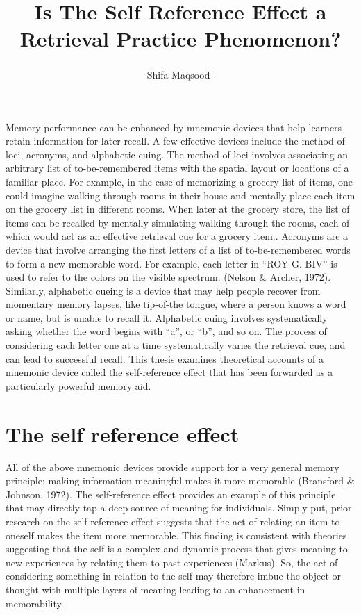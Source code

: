 \documentclass[
  man,floatsintext]{apa6}
\title{Is The Self Reference Effect a Retrieval Practice Phenomenon?}
\author{Shifa Maqsood\textsuperscript{1}}
\date{}
\affiliation{\vspace{0.5cm}\textsuperscript{1} Brooklyn College of CUNY}
\begin{document}
\maketitle

Memory performance can be enhanced by mnemonic devices that help learners retain information for later recall. A few effective devices include the method of loci, acronyms, and alphabetic cuing. The method of loci involves associating an arbitrary list of to-be-remembered items with the spatial layout or locations of a familiar place. For example, in the case of memorizing a grocery list of items, one could imagine walking through rooms in their house and mentally place each item on the grocery list in different rooms. When later at the grocery store, the list of items can be recalled by mentally simulating walking through the rooms, each of which would act as an effective retrieval cue for a grocery item.. Acronyms are a device that involve arranging the first letters of a list of to-be-remembered words to form a new memorable word. For example, each letter in ``ROY G. BIV'' is used to refer to the colors on the visible spectrum. (Nelson \& Archer, 1972). Similarly, alphabetic cueing is a device that may help people recover from momentary memory lapses, like tip-of-the tongue, where a person knows a word or name, but is unable to recall it. Alphabetic cuing involves systematically asking whether the word begins with ``a'', or ``b'', and so on. The process of considering each letter one at a time systematically varies the retrieval cue, and can lead to successful recall. This thesis examines theoretical accounts of a mnemonic device called the self-reference effect that has been forwarded as a particularly powerful memory aid.

\hypertarget{the-self-reference-effect}{%
\section{The self reference effect}\label{the-self-reference-effect}}

All of the above mnemonic devices provide support for a very general memory principle: making information meaningful makes it more memorable (Bransford \& Johnson, 1972). The self-reference effect provides an example of this principle that may directly tap a deep source of meaning for individuals. Simply put, prior research on the self-reference effect suggests that the act of relating an item to oneself makes the item more memorable. This finding is consistent with theories suggesting that the self is a complex and dynamic process that gives meaning to new experiences by relating them to past experiences (Markus). So, the act of considering something in relation to the self may therefore imbue the object or thought with multiple layers of meaning leading to an enhancement in memorability.
\end{document}
